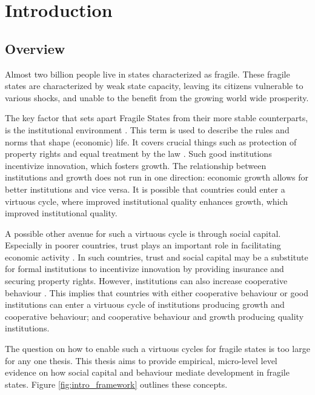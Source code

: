 \chapter{Introduction}
\section{Overview}



Almost two billion people live in states characterized  as fragile. These fragile states are characterized by weak state capacity, leaving its citizens vulnerable to various shocks, and unable to the benefit from the growing world wide prosperity. 

The key factor that sets apart Fragile States from their more stable counterparts, is the institutional environment \citep{Rodrik2004,Acemoglu2000}. This term is used to describe the rules and norms that shape (economic) life. It covers crucial things such as protection of property rights and equal treatment by the law \citep{Acemoglu2005}. Such good institutions incentivize innovation, which fosters growth. The relationship between institutions and growth does not run in one direction: economic growth allows for better institutions and vice versa. It is possible that countries could enter a virtuous cycle, where improved institutional quality enhances growth, which improved institutional quality.

A possible other avenue for such a virtuous cycle is through social capital.  Especially in poorer countries, trust plays an important role in facilitating economic activity \citep{Knack1997}. In such countries, trust and social capital may be a substitute for formal institutions to incentivize innovation by providing insurance and securing property rights. However, institutions can also increase cooperative behaviour \cite{Bo2008,Henrich2010}. This implies that countries with either cooperative behaviour or good institutions can enter a virtuous cycle of institutions producing growth and cooperative behaviour; and cooperative behaviour and growth producing quality institutions.

The question on how to enable such a virtuous cycles for fragile states is too large for any one thesis. This thesis aims to provide empirical, micro-level level evidence on how social capital and behaviour mediate development in fragile states. Figure \ref{fig:intro_framework} outlines these concepts. 

